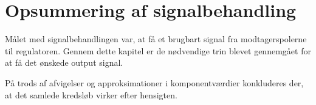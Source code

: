 \section{Opsummering af signalbehandling}\label{sec:delkonklusion_signal}
Målet med signalbehandlingen var, at få et brugbart signal fra modtagerspolerne til regulatoren. Gennem dette kapitel er de nødvendige trin blevet gennemgået for at få det ønskede output signal.

På trods af afvigelser og approksimationer i komponentværdier konkluderes der, at det samlede kredsløb virker efter hensigten.